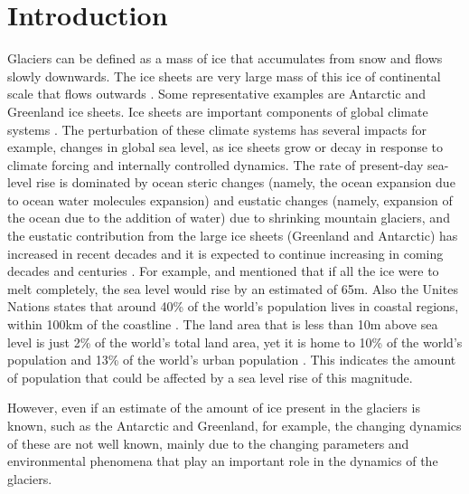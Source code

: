 \documentclass{article}
\begin{document}



\tableofcontents

\pagebreak

\section{Introduction}
\justifying
Glaciers can be defined as a mass of ice that accumulates from snow and flows slowly downwards. The ice sheets are very large mass of this ice of continental scale that flows outwards \cite[]{anesio2012glaciers}. Some representative examples are Antarctic and Greenland ice sheets. Ice sheets are important components of global climate systems \cite[]{zhang2017comparison}. The perturbation of these climate systems has several impacts for example, changes in global sea level, as ice sheets grow or decay in response to climate forcing and internally controlled dynamics. The rate of present-day sea-level rise is dominated by ocean steric changes (namely, the ocean expansion due to ocean water molecules expansion) and eustatic changes (namely, expansion of the ocean due to the addition of water) due to shrinking mountain glaciers, and the eustatic contribution from the large ice sheets (Greenland and Antarctic) has increased in recent decades and it is expected to continue increasing in coming decades and centuries \cite[]{clark2015recent}. For example, \cite{morlighem2017bedmachine} and \cite{haywood2011pliocene} mentioned that if all the ice were to melt completely, the sea level would rise by an estimated of 65m. Also the Unites Nations states that around 40\% of the world's population lives in coastal regions, within 100km of the coastline \cite[]{barbier2015climate, montgomery2007united}. The land area that is less than 10m above sea level is just 2\% of the world's total land area, yet it is home to 10\% of the world's population and 13\% of the world's urban population \cite[]{nevermann2023land}. This indicates the amount of population that could be affected by a sea level rise of this magnitude. 

However, even if an estimate of the amount of ice present in the glaciers is known, such as the Antarctic and Greenland, for example, the changing dynamics of these are not well known, mainly due to the changing parameters and environmental phenomena that play an important role in the dynamics of the glaciers.
\end{document}
